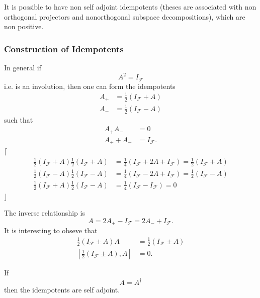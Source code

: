\documentclass[aps,preprint]{revtex4}%
\begin{document}
It is possible to have non self adjoint idempotents (theses are associated
with non orthogonal projectors and nonorthogonal subspace decompositions),
which are non positive.

\subsubsection{Construction of Idempotents}

In general if
\begin{equation}
A^{2}=I_{\mathcal{F}}%
\end{equation}
i.e. is an involution, then one can form the idempotents
\begin{align}
A_{+}  &  =\frac{1}{2}\left(  I_{\mathcal{F}}+A\right) \\
A_{-}  &  =\frac{1}{2}\left(  I_{\mathcal{F}}-A\right)
\end{align}
such that
\begin{align}
A_{+}A_{-}  &  =0\\
A_{+}+A_{-}  &  =I_{\mathcal{F}}.
\end{align}
$\lceil$%
\begin{align}
\frac{1}{2}\left(  I_{\mathcal{F}}+A\right)  \frac{1}{2}\left(  I_{\mathcal{F}%
}+A\right)   &  =\frac{1}{4}\left(  I_{\mathcal{F}}+2A+I_{\mathcal{F}}\right)
=\frac{1}{2}\left(  I_{\mathcal{F}}+A\right) \\
\frac{1}{2}\left(  I_{\mathcal{F}}-A\right)  \frac{1}{2}\left(  I_{\mathcal{F}%
}-A\right)   &  =\frac{1}{4}\left(  I_{\mathcal{F}}-2A+I_{\mathcal{F}}\right)
=\frac{1}{2}\left(  I_{\mathcal{F}}-A\right) \\
\frac{1}{2}\left(  I_{\mathcal{F}}+A\right)  \frac{1}{2}\left(  I_{\mathcal{F}%
}-A\right)   &  =\frac{1}{4}\left(  I_{\mathcal{F}}-I_{\mathcal{F}}\right)  =0
\end{align}
$\rfloor$

The inverse relationship is
\begin{equation}
A=2A_{+}-I_{\mathcal{F}}=2A_{-}+I_{\mathcal{F}}.
\end{equation}
It is interesting to obseve that
\begin{align}
\frac{1}{2}\left(  I_{\mathcal{F}}\pm A\right)  A  &  =\frac{1}{2}\left(
I_{\mathcal{F}}\pm A\right) \\
\left[  \frac{1}{2}\left(  I_{\mathcal{F}}\pm A\right)  ,A\right]   &  =0.
\end{align}


If
\begin{equation}
A=A^{\dagger}%
\end{equation}
then the idempotents are self adjoint.
\end{document}

